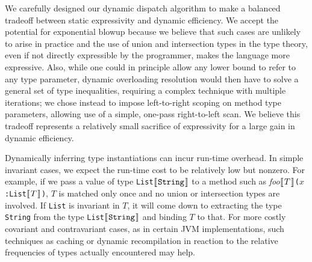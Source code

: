 
We carefully designed our dynamic dispatch algorithm to
make a balanced tradeoff between static expressivity and dynamic
efficiency.  We accept the potential for exponential blowup
because we believe that such cases are unlikely to
arise in practice and the use of union and intersection types in the
type theory, even if not directly expressible by the programmer, makes
the language more expressive.  Also, while one could in principle
allow any lower bound to refer to any type parameter, dynamic
overloading resolution would then have to solve a general set of type
inequalities, requiring a complex technique with multiple iterations;
we chose instead to impose left-to-right scoping on method type
parameters, allowing use of a simple, one-pass right-to-left scan.
We believe this tradeoff represents a relatively small sacrifice of expressivity for
a large gain in dynamic efficiency.

Dynamically inferring type instantiations can incur run-time overhead.
In simple invariant cases, we expect the run-time cost to be relatively low but nonzero.
For example, if we pass a value of type \texttt{List$\ob{\texttt{String}}$} to a method such as
\textit{foo}$\ob{T}$\texttt{($x$:List$\ob{T}$)},
$T$ is matched only once and no union or intersection types are involved.
If \texttt{List} is invariant in $T$, it will come down to extracting the type \texttt{String}
from the type \texttt{List$\ob{\texttt{String}}$} and binding $T$ to that.
For more costly covariant and contravariant cases,
as in certain JVM implementations, such techniques as caching or dynamic recompilation
in reaction to the relative frequencies of types actually encountered may help.


